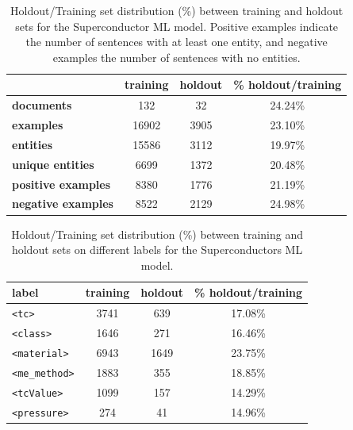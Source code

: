 \begin{table}[ht]
    \centering
    \caption{Holdout/Training set distribution (\%) between training and holdout sets for the Superconductor ML model. Positive examples indicate the number of sentences with at least one entity, and negative examples the number of sentences with no entities.}
    \begin{tabular}{lccc}
        \toprule
                                      & \textbf{training} & \textbf{holdout} & \textbf{\% holdout/training} \\
        \midrule
        \textbf{documents}         & 132               & 32               & 24.24\%                   \\
        \textbf{examples}          & 16902             & 3905             & 23.10\%                   \\
        \textbf{entities}          & 15586             & 3112             & 19.97\%                   \\
        \textbf{unique entities}   & 6699              & 1372             & 20.48\%                   \\
        \textbf{positive examples} & 8380              & 1776             & 21.19\%                   \\
        \textbf{negative examples} & 8522              & 2129             & 24.98\%                   \\
        \bottomrule
    \end{tabular}
    
    \label{tab:training-holdout-set-distribution-annex}
\end{table}

\begin{table}[ht]
    \centering
    \caption{Holdout/Training set distribution (\%) between training and holdout sets on different labels for the Superconductors ML model.}
    \begin{tabular}{lccc}
        \toprule
        label                 & \textbf{training} & \textbf{holdout} & \textbf{\% holdout/training } \\
        \midrule
        \texttt{<tc>}         & 3741              & 639              & 17.08\%                    \\
        \texttt{<class>}      & 1646              & 271              & 16.46\%                    \\
        \texttt{<material>}   & 6943              & 1649             & 23.75\%                    \\
        \texttt{<me\_method>} & 1883              & 355              & 18.85\%                    \\
        \texttt{<tcValue>}    & 1099              & 157              & 14.29\%                    \\
        \texttt{<pressure>}   & 274               & 41               & 14.96\%                    \\
        \bottomrule
    \end{tabular}
    \label{tab:training-holdout-labels-distribution-annex}
\end{table}


